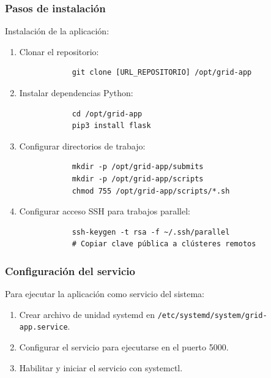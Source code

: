 \subsubsection{Pasos de instalación}
\noindent

Instalación de la aplicación:

\begin{enumerate}
	\item Clonar el repositorio:
	      \begin{verbatim}
			git clone [URL_REPOSITORIO] /opt/grid-app
		\end{verbatim}
	
	\item Instalar dependencias Python:
	      \begin{verbatim}
			cd /opt/grid-app
			pip3 install flask
		\end{verbatim}
	
	\item Configurar directorios de trabajo:
	      \begin{verbatim}
			mkdir -p /opt/grid-app/submits
			mkdir -p /opt/grid-app/scripts
			chmod 755 /opt/grid-app/scripts/*.sh
		\end{verbatim}
	
	\item Configurar acceso SSH para trabajos parallel:
	      \begin{verbatim}
			ssh-keygen -t rsa -f ~/.ssh/parallel
			# Copiar clave pública a clústeres remotos
		\end{verbatim}
\end{enumerate}

\subsubsection{Configuración del servicio}
\noindent

Para ejecutar la aplicación como servicio del sistema:

\begin{enumerate}
	\item Crear archivo de unidad systemd en \texttt{/etc/systemd/system/grid-app.service}.
	\item Configurar el servicio para ejecutarse en el puerto 5000.
	\item Habilitar y iniciar el servicio con systemctl.
\end{enumerate}

